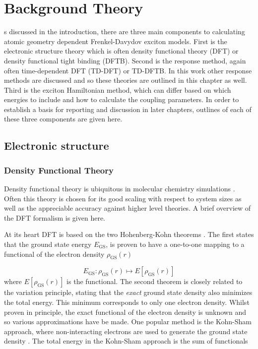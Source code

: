 %
%
\let\textcircled=\pgftextcircled
\chapter{Background Theory}
\label{chap:background_theory}

s discussed in the introduction, there are three main components to
calculating atomic geometry dependent Frenkel-Davydov exciton models. First is the
electronic structure theory which is often density functional theory (DFT) or density 
functional tight binding (DFTB). Second is the response method, again often time-dependent
DFT (TD-DFT) or TD-DFTB. In this work other response methods are discussed and so
these theories are outlined in this chapter as well. Third is the exciton Hamiltonian 
method, which can differ based on which energies to include and how to calculate
the coupling parameters. In order to establish a basis for reporting and discussion 
in later chapters, outlines of each of these three components are given here.

\section{Electronic structure}
\label{sec:electronic_structure}

\subsection{Density Functional Theory}
\label{subsec:dft}

Density functional theory is ubiquitous in molecular chemistry simulations \cite{Maitra2016}.
Often this theory is chosen for its good scaling with respect to system sizes as 
well as the appreciable accuracy against higher level theories. A brief overview
of the DFT formalism is given here.

At its heart DFT is based on the two Hohenberg-Kohn theorems \cite{Kohn1964}. The
first states that the ground state energy $E_{\text{GS}}$, is proven to have a one-to-one
mapping to a functional of the electron density $\rho_{\text{GS}} \left(r\right)$

\begin{equation}
    E_{\text{GS}} : \rho_{\text{GS}} \left(r\right) \mapsto E \left[ \rho_{\text{GS}} \left(r\right)\right]
\end{equation}
%
where $E \left[ \rho_{\text{GS}} \left(r\right)\right]$ is the functional. The second
theorem is closely related to the variation principle, stating that the \emph{exact}
ground state density also minimizes the total energy. This minimum corresponds to 
only one electron density. Whilst proven in principle, the exact functional of the
electron density is unknown and so various approximations have be made. One popular
method is the Kohn-Sham approach, where non-interacting electrons are used to generate
the ground state density \cite{Kohn1965}. The total energy in the Kohn-Sham approach
is the sum of functionals


